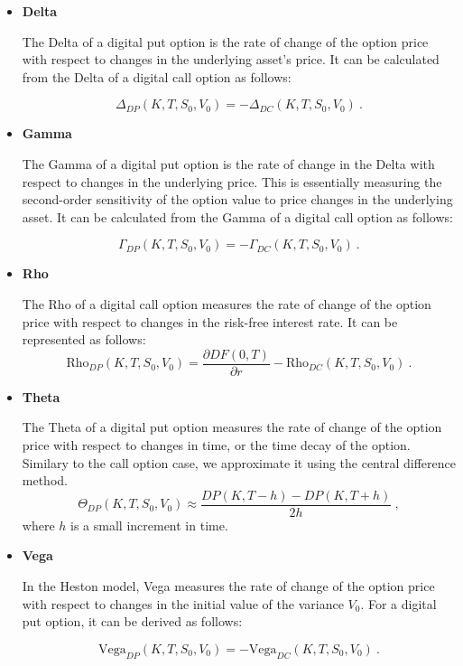 \begin{itemize}

\item \textbf{Delta} 

The Delta of a digital put option is the rate of change of the option price with respect to changes in the underlying asset's price. It can be calculated from the Delta of a digital call option as follows:

$$
\Delta_{DP}(K,T,S_0,V_0) = -\Delta_{DC}(K,T,S_0,V_0) \ .
$$

\item \textbf{Gamma} 

The Gamma of a digital put option is the rate of change in the Delta with respect to changes in the underlying price. This is essentially measuring the second-order sensitivity of the option value to price changes in the underlying asset. It can be calculated from the Gamma of a digital call option as follows:

$$
\Gamma_{DP}(K,T,S_0,V_0) = -\Gamma_{DC}(K,T,S_0,V_0) \ .
$$



\item \textbf{Rho} 

The Rho of a digital call option measures the rate of change of the option price with respect to changes in the risk-free interest rate. It can be represented as follows:
$$
\text{Rho}_{DP}(K,T,S_0,V_0) = 
\frac{\partial DF(0,T)}{\partial r}  - \text{Rho}_{DC}(K,T,S_0,V_0) \ .
$$


\item \textbf{Theta} 

The Theta of a digital put option measures the rate of change of the option price with respect to changes in time, or the time decay of the option. Similary to the call option case, we approximate it using the central difference method. 
$$
 \Theta_{DP}(K,T,S_0,V_0) \approx \frac{DP(K,T-h) - DP(K,T+h)}{2h} \ ,
$$
where $h$ is a small increment in time. 

\item \textbf{Vega} 

In the Heston model, Vega measures the rate of change of the option price with respect to changes in the initial value of the variance $V_0$. For a digital put option, it can be derived as follows:

$$
\text{Vega}_{DP}(K,T,S_0,V_0) = - \text{Vega}_{DC}(K,T,S_0,V_0) \ .
$$






\end{itemize}







